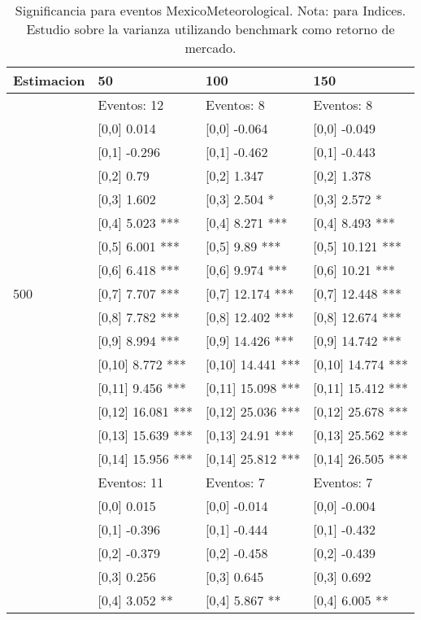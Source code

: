 \begin{table}

\caption{Significancia para eventos MexicoMeteorological. Nota: para Indices. Estudio sobre la varianza utilizando benchmark como retorno de mercado.}
\centering
\begin{tabular}[t]{llll}
\toprule
Estimacion & 50 & 100 & 150\\
\midrule
 & Eventos:  12 & Eventos:  8 & Eventos:  8\\
 & {}[0,0] 0.014 & {}[0,0] -0.064 & {}[0,0] -0.049\\
 & {}[0,1] -0.296 & {}[0,1] -0.462 & {}[0,1] -0.443\\
 & {}[0,2] 0.79 & {}[0,2] 1.347 & {}[0,2] 1.378\\
 & {}[0,3] 1.602 & {}[0,3] 2.504 * & {}[0,3] 2.572 *\\
\addlinespace
 & {}[0,4] 5.023 *** & {}[0,4] 8.271 *** & {}[0,4] 8.493 ***\\
 & {}[0,5] 6.001 *** & {}[0,5] 9.89 *** & {}[0,5] 10.121 ***\\
 & {}[0,6] 6.418 *** & {}[0,6] 9.974 *** & {}[0,6] 10.21 ***\\
500 & {}[0,7] 7.707 *** & {}[0,7] 12.174 *** & {}[0,7] 12.448 ***\\
 & {}[0,8] 7.782 *** & {}[0,8] 12.402 *** & {}[0,8] 12.674 ***\\
\addlinespace
 & {}[0,9] 8.994 *** & {}[0,9] 14.426 *** & {}[0,9] 14.742 ***\\
 & {}[0,10] 8.772 *** & {}[0,10] 14.441 *** & {}[0,10] 14.774 ***\\
 & {}[0,11] 9.456 *** & {}[0,11] 15.098 *** & {}[0,11] 15.412 ***\\
 & {}[0,12] 16.081 *** & {}[0,12] 25.036 *** & {}[0,12] 25.678 ***\\
 & {}[0,13] 15.639 *** & {}[0,13] 24.91 *** & {}[0,13] 25.562 ***\\
\addlinespace
 & {}[0,14] 15.956 *** & {}[0,14] 25.812 *** & {}[0,14] 26.505 ***\\
 & Eventos:  11 & Eventos:  7 & Eventos:  7\\
 & {}[0,0] 0.015 & {}[0,0] -0.014 & {}[0,0] -0.004\\
 & {}[0,1] -0.396 & {}[0,1] -0.444 & {}[0,1] -0.432\\
 & {}[0,2] -0.379 & {}[0,2] -0.458 & {}[0,2] -0.439\\
\addlinespace
 & {}[0,3] 0.256 & {}[0,3] 0.645 & {}[0,3] 0.692\\
 & {}[0,4] 3.052 ** & {}[0,4] 5.867 ** & {}[0,4] 6.005 **\\

\end{tabular}
\end{table}
